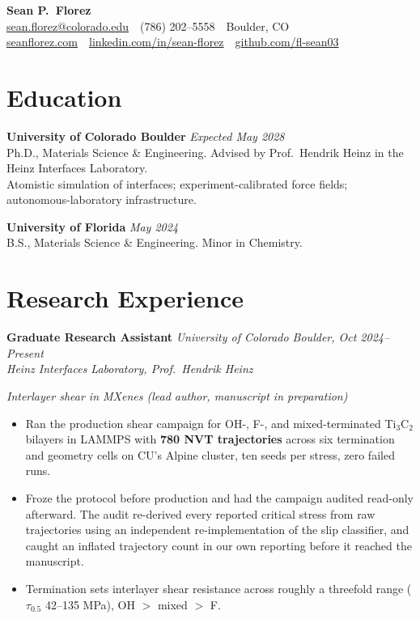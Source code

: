 \documentclass[letterpaper,10pt]{article}
\newcommand{\keep}{\needspace{4\baselineskip}}
\newcommand{\keepsection}{\needspace{6\baselineskip}}
\begin{document}
\pagestyle{plain}

\begin{center}
    {\LARGE \textbf{Sean P.\ Florez}}\\
    \href{mailto:sean.florez@colorado.edu}{sean.florez@colorado.edu} \,\textbar\, (786) 202--5558 \,\textbar\, Boulder, CO\\
    \href{https://seanflorez.com}{seanflorez.com} \,\textbar\,
    \href{https://linkedin.com/in/sean-florez}{linkedin.com/in/sean-florez} \,\textbar\,
    \href{https://github.com/fl-sean03}{github.com/fl-sean03}
\end{center}

\section*{Education}
\textbf{University of Colorado Boulder} \hfill \textit{Expected May 2028}\\
Ph.D., Materials Science \& Engineering. Advised by Prof.\ Hendrik Heinz in the Heinz Interfaces Laboratory.\\
Atomistic simulation of interfaces; experiment-calibrated force fields; autonomous-laboratory infrastructure.

\textbf{University of Florida} \hfill \textit{May 2024}\\
B.S., Materials Science \& Engineering. Minor in Chemistry.

\keepsection\section*{Research Experience}
\textbf{Graduate Research Assistant} \hfill \textit{University of Colorado Boulder, Oct 2024--Present}\\
\textit{Heinz Interfaces Laboratory, Prof.\ Hendrik Heinz}

\keep\textit{Interlayer shear in MXenes (lead author, manuscript in preparation)}
\begin{itemize}
    \item Ran the production shear campaign for OH-, F-, and mixed-terminated Ti\(_3\)C\(_2\) bilayers in LAMMPS with \textbf{780 NVT trajectories} across six termination and geometry cells on CU's Alpine cluster, ten seeds per stress, zero failed runs.
    \item Froze the protocol before production and had the campaign audited read-only afterward. The audit re-derived every reported critical stress from raw trajectories using an independent re-implementation of the slip classifier, and caught an inflated trajectory count in our own reporting before it reached the manuscript.
    \item Termination sets interlayer shear resistance across roughly a threefold range (\(\tau_{0.5}\) 42--135 MPa), OH \(>\) mixed \(>\) F.
\end{itemize}
\end{document}
